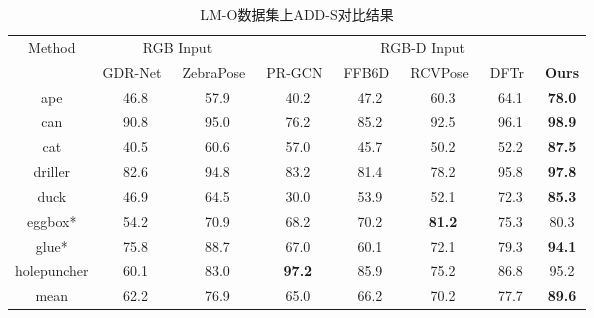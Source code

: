 \begin{sidewaystable}
  \centering
  \begin{tabular}{c|c|c|c|c|c|c|c}
    \toprule 
    \multirow{2}{*}{Method} & \multicolumn{2}{c|}{RGB Input} & \multicolumn{5}{c}{RGB-D Input} \\ 
         \cline{2-8}
      & GDR-Net~\cite{wang2021gdr} 
& ZebraPose~\cite{su2022zebrapose}&  PR-GCN~\cite{Zhou2021PRGCNAD} 
&  FFB6D~\cite{he2021ffb6d} 
& RCVPose~\cite{wu2022vote} 
& DFTr~\cite{zhou2023deep} &\textbf{Ours}\\
    \midrule
     ape & 46.8 
& 57.9& 40.2 
& 47.2 
&  60.3 
& 64.1 &  \textbf{78.0}\\
     can & 90.8 
& 95.0& 76.2 
& 85.2 
&  92.5 
& 96.1 &  \textbf{98.9}  \\
     cat & 40.5 
& 60.6& 57.0 
& 45.7 
&  50.2 
& 52.2 &  \textbf{87.5}\\
     driller & 82.6 
& 94.8& 83.2 
& 81.4 
&  78.2 
& 95.8 &  \textbf{97.8}\\
     duck & 46.9 
& 64.5& 30.0 
& 53.9 
&  52.1 
& 72.3 &  \textbf{85.3}\\
     eggbox* & 54.2 
& 70.9& 68.2 
& 70.2 
&  \textbf{81.2} 
& 75.3 &  80.3\\
     glue* & 75.8 
& 88.7& 67.0 
& 60.1 
&  72.1 
& 79.3 &  \textbf{94.1}\\
     holepuncher & 60.1 
& 83.0& \textbf{97.2} 
& 85.9 
& 75.2 
& 86.8 &  95.2  \\
     \hline
     mean & 62.2 & 76.9&  65.0 &  66.2 &  70.2 & 77.7 & \textbf{89.6}\\
    \bottomrule
  \end{tabular}
  \caption{LM-O数据集上ADD-S对比结果}
  \label{tab:lmo_results_table_}
\end{sidewaystable}

